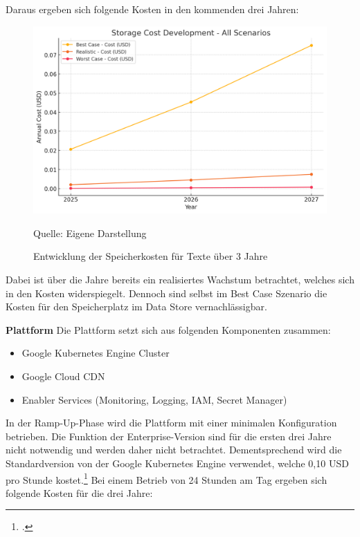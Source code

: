 Daraus ergeben sich folgende Kosten in den kommenden drei Jahren:
\begin{figure}[htbp]
    \includegraphics[width=\textwidth, height=\textheight, keepaspectratio]{abbildungen/Kosten_Speicher_Text}
    \caption{Entwicklung der Speicherkosten für Texte über 3 Jahre}
    \label{fig:KostenentwicklungSpeicherText}
    \vspace{0.5cm}
    \raggedright Quelle: Eigene Darstellung
\end{figure}

Dabei ist über die Jahre bereits ein realisiertes Wachstum betrachtet, welches sich in den Kosten widerspiegelt.
Dennoch sind selbst im Best Case Szenario die Kosten für den Speicherplatz im Data Store vernachlässigbar.

\textbf{Plattform}\newline
Die Plattform setzt sich aus folgenden Komponenten zusammen:
\begin{itemize}
    \item Google Kubernetes Engine Cluster
    \item Google Cloud CDN
    \item Enabler Services (Monitoring, Logging, IAM, Secret Manager)
\end{itemize}

In der Ramp-Up-Phase wird die Plattform mit einer minimalen Konfiguration betrieben.
Die Funktion der Enterprise-Version sind für die ersten drei Jahre nicht notwendig und werden daher nicht betrachtet.
Dementsprechend wird die Standardversion von der Google Kubernetes Engine verwendet, welche 0,10 \ac{USD} pro Stunde kostet.\footcite{GoogleKubernetesEnginePricing2025}
Bei einem Betrieb von 24 Stunden am Tag ergeben sich folgende Kosten für die drei Jahre:

